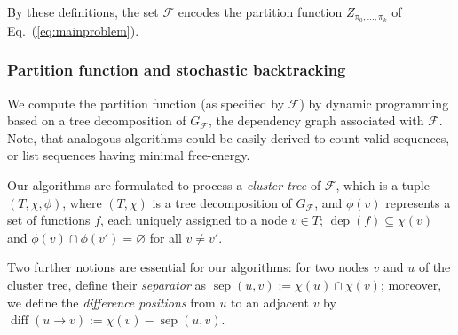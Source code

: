 \documentclass[]{bmcart}
\newcommand{\dep}{\operatorname{dep}}
\newcommand{\partfun}[1]{Z_{#1}}
\newcommand{\separator}[2]{\operatorname{sep}(#1,#2)}
\newcommand{\difference}[2]{\operatorname{diff}(#1 \rightarrow #2)}
\newcommand{\F}{\mathcal{F}}
\newcommand{\Def}[1]{\emph{#1}}
\begin{document}
By these definitions, the set $\F$ encodes the partition function $\partfun{\pi_0,\dots,\pi_k}$ of Eq.~(\ref{eq:mainproblem}).

\subsubsection*{Partition function and stochastic backtracking}\label{sec:PF}

We compute the partition function (as specified by $\F$) by dynamic programming based
on a tree decomposition of $G_{\F}$, the dependency graph associated with $\F$.
Note, that analogous algorithms could be easily derived to count valid sequences, or list sequences having minimal free-energy.

%

Our algorithms are formulated to process a \Def{cluster tree} of $\F$, which is a tuple $(T,\chi,\phi)$, where
$(T,\chi)$ is a tree decomposition of $G_\F$, and $\phi(v)$ represents
a set of functions $f$, each uniquely assigned to a node $v\in T$;
$\dep(f)\subseteq\chi(v)$ and $\phi(v)\cap \phi(v')=\varnothing$ for
all $v\neq v'$. 

Two further notions are essential for our algorithms: for two nodes $v$ and $u$ of the cluster tree, define
their \Def{separator} as $\separator{u}{v} := \chi(u)\cap\chi(v)$;
moreover, we define the \Def{difference positions} from $u$ to an
adjacent $v$ by $\difference{u}{v}:=\chi(v) - \separator{u}{v}$.
\end{document}
